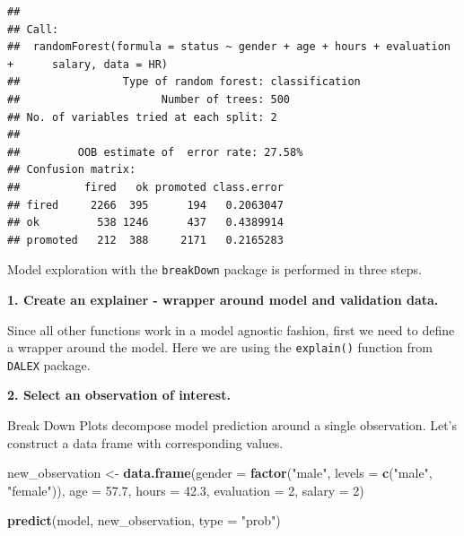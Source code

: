\documentclass[]{krantz}
\newenvironment{Shaded}{\begin{snugshade}}{\end{snugshade}}
\newcommand{\ControlFlowTok}[1]{\textcolor[rgb]{0.13,0.29,0.53}{\textbf{#1}}}
\newcommand{\DataTypeTok}[1]{\textcolor[rgb]{0.13,0.29,0.53}{#1}}
\newcommand{\DecValTok}[1]{\textcolor[rgb]{0.00,0.00,0.81}{#1}}
\newcommand{\FloatTok}[1]{\textcolor[rgb]{0.00,0.00,0.81}{#1}}
\newcommand{\KeywordTok}[1]{\textcolor[rgb]{0.13,0.29,0.53}{\textbf{#1}}}
\newcommand{\NormalTok}[1]{#1}
\newcommand{\OperatorTok}[1]{\textcolor[rgb]{0.81,0.36,0.00}{\textbf{#1}}}
\newcommand{\StringTok}[1]{\textcolor[rgb]{0.31,0.60,0.02}{#1}}
\theoremstyle{definition}
\theoremstyle{definition}
\theoremstyle{definition}
\theoremstyle{remark}
\begin{document}
\begin{verbatim}
## 
## Call:
##  randomForest(formula = status ~ gender + age + hours + evaluation +      salary, data = HR) 
##                Type of random forest: classification
##                      Number of trees: 500
## No. of variables tried at each split: 2
## 
##         OOB estimate of  error rate: 27.58%
## Confusion matrix:
##          fired   ok promoted class.error
## fired     2266  395      194   0.2063047
## ok         538 1246      437   0.4389914
## promoted   212  388     2171   0.2165283
\end{verbatim}

Model exploration with the \texttt{breakDown} package is performed in
three steps.

\textbf{1. Create an explainer - wrapper around model and validation
data.}

Since all other functions work in a model agnostic fashion, first we
need to define a wrapper around the model. Here we are using the
\texttt{explain()} function from \texttt{DALEX} package.

\begin{Shaded}
\end{Shaded}

\textbf{2. Select an observation of interest.}

Break Down Plots decompose model prediction around a single observation.
Let's construct a data frame with corresponding values.

\begin{Shaded}
\begin{Highlighting}[]
\NormalTok{new_observation <-}\StringTok{ }\KeywordTok{data.frame}\NormalTok{(}\DataTypeTok{gender =} \KeywordTok{factor}\NormalTok{(}\StringTok{"male"}\NormalTok{, }\DataTypeTok{levels =} \KeywordTok{c}\NormalTok{(}\StringTok{"male"}\NormalTok{, }\StringTok{"female"}\NormalTok{)),}
                      \DataTypeTok{age =} \FloatTok{57.7}\NormalTok{,}
                      \DataTypeTok{hours =} \FloatTok{42.3}\NormalTok{,}
                      \DataTypeTok{evaluation =} \DecValTok{2}\NormalTok{,}
                      \DataTypeTok{salary =} \DecValTok{2}\NormalTok{)}

\KeywordTok{predict}\NormalTok{(model, new_observation, }\DataTypeTok{type =} \StringTok{"prob"}\NormalTok{)}
\end{Highlighting}
\end{Shaded}
\end{document}
